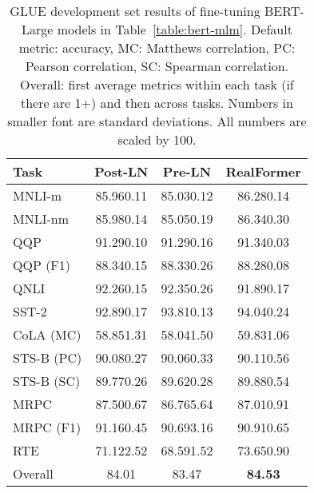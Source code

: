\documentclass[11pt,a4paper]{article}
\begin{document}
\begin{table}[t]
\setlength{\tabcolsep}{3.5pt}
\centering
\begin{tabular}{lccc}
\hline 
\textbf{Task}      & \textbf{Post-LN}     & \textbf{Pre-LN}       & \textbf{RealFormer}      \\ \hline
MNLI-m             & 85.96\tiny{0.11}  & 85.03\tiny{0.12}   & 86.28\tiny{0.14}  \\
MNLI-nm            & 85.98\tiny{0.14}  & 85.05\tiny{0.19}   & 86.34\tiny{0.30}  \\
QQP                & 91.29\tiny{0.10}  & 91.29\tiny{0.16}   & 91.34\tiny{0.03}  \\
QQP \small{(F1)}   & 88.34\tiny{0.15}  & 88.33\tiny{0.26}   & 88.28\tiny{0.08}  \\
QNLI               & 92.26\tiny{0.15}  & 92.35\tiny{0.26}   & 91.89\tiny{0.17}  \\
SST-2              & 92.89\tiny{0.17}  & 93.81\tiny{0.13}   & 94.04\tiny{0.24}  \\
CoLA \small{(MC)}  & 58.85\tiny{1.31}  & 58.04\tiny{1.50}   & 59.83\tiny{1.06}  \\
STS-B \small{(PC)} & 90.08\tiny{0.27}  & 90.06\tiny{0.33}   & 90.11\tiny{0.56}  \\
STS-B \small{(SC)} & 89.77\tiny{0.26}  & 89.62\tiny{0.28}   & 89.88\tiny{0.54}  \\
MRPC               & 87.50\tiny{0.67}  & 86.76\tiny{5.64}   & 87.01\tiny{0.91}  \\
MRPC \small{(F1)}  & 91.16\tiny{0.45}  & 90.69\tiny{3.16}   & 90.91\tiny{0.65}  \\
RTE                & 71.12\tiny{2.52}  & 68.59\tiny{1.52}   & 73.65\tiny{0.90}  \\ \hline
Overall            & 84.01                  & 83.47                   & \textbf{84.53}  \\
\hline
\end{tabular}
\caption{\label{table:glue} GLUE development set results of fine-tuning BERT-Large models in Table~\ref{table:bert-mlm}. Default metric: accuracy, MC: Matthews correlation, PC: Pearson correlation, SC: Spearman correlation. Overall: first average metrics within each task (if there are 1+) and then across tasks. Numbers in smaller font are standard deviations. All numbers are scaled by 100.}
\end{table}
\end{document}
